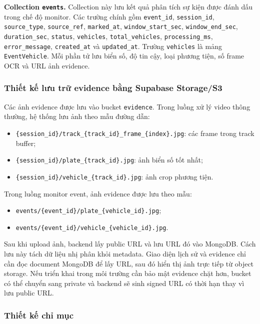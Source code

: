 \textbf{Collection \texttt{events}.} Collection này lưu kết quả phân tích sự kiện được đánh dấu trong chế độ monitor. Các trường chính gồm \texttt{event\_id}, \texttt{session\_id}, \texttt{source\_type}, \texttt{source\_ref}, \texttt{marked\_at}, \texttt{window\_start\_sec}, \texttt{window\_end\_sec}, \texttt{duration\_sec}, \texttt{status}, \texttt{vehicles}, \texttt{total\_vehicles}, \texttt{processing\_ms}, \texttt{error\_message}, \texttt{created\_at} và \texttt{updated\_at}. Trường \texttt{vehicles} là mảng \texttt{EventVehicle}. Mỗi phần tử lưu biển số, độ tin cậy, loại phương tiện, số frame OCR và URL ảnh evidence.

\subsubsection{Thiết kế lưu trữ evidence bằng Supabase Storage/S3}

Các ảnh evidence được lưu vào bucket \texttt{evidence}. Trong luồng xử lý video thông thường, hệ thống lưu ảnh theo mẫu đường dẫn:

\begin{itemize}
    \item \texttt{\{session\_id\}/track\_\{track\_id\}\_frame\_\{index\}.jpg}: các frame trong track buffer;
    \item \texttt{\{session\_id\}/plate\_\{track\_id\}.jpg}: ảnh biển số tốt nhất;
    \item \texttt{\{session\_id\}/vehicle\_\{track\_id\}.jpg}: ảnh crop phương tiện.
\end{itemize}

Trong luồng monitor event, ảnh evidence được lưu theo mẫu:

\begin{itemize}
    \item \texttt{events/\{event\_id\}/plate\_\{vehicle\_id\}.jpg};
    \item \texttt{events/\{event\_id\}/vehicle\_\{vehicle\_id\}.jpg}.
\end{itemize}

Sau khi upload ảnh, backend lấy public URL và lưu URL đó vào MongoDB. Cách lưu này tách dữ liệu nhị phân khỏi metadata. Giao diện lịch sử và evidence chỉ cần đọc document MongoDB để lấy URL, sau đó hiển thị ảnh trực tiếp từ object storage. Nếu triển khai trong môi trường cần bảo mật evidence chặt hơn, bucket có thể chuyển sang private và backend sẽ sinh signed URL có thời hạn thay vì lưu public URL.

\subsubsection{Thiết kế chỉ mục}

